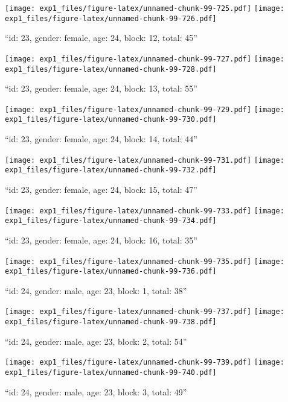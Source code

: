 \documentclass[,]{article}
\begin{document}
\texttt{[image: exp1\_files/figure-latex/unnamed-chunk-99-725.pdf]}
\texttt{[image: exp1\_files/figure-latex/unnamed-chunk-99-726.pdf]}

\newpage
[1] 

``id: 23, gender: female, age: 24, block: 12, total: 45''

\texttt{[image: exp1\_files/figure-latex/unnamed-chunk-99-727.pdf]}
\texttt{[image: exp1\_files/figure-latex/unnamed-chunk-99-728.pdf]}

\newpage
[1] 

``id: 23, gender: female, age: 24, block: 13, total: 55''

\texttt{[image: exp1\_files/figure-latex/unnamed-chunk-99-729.pdf]}
\texttt{[image: exp1\_files/figure-latex/unnamed-chunk-99-730.pdf]}

\newpage
[1] 

``id: 23, gender: female, age: 24, block: 14, total: 44''

\texttt{[image: exp1\_files/figure-latex/unnamed-chunk-99-731.pdf]}
\texttt{[image: exp1\_files/figure-latex/unnamed-chunk-99-732.pdf]}

\newpage
[1] 

``id: 23, gender: female, age: 24, block: 15, total: 47''

\texttt{[image: exp1\_files/figure-latex/unnamed-chunk-99-733.pdf]}
\texttt{[image: exp1\_files/figure-latex/unnamed-chunk-99-734.pdf]}

\newpage
[1] 

``id: 23, gender: female, age: 24, block: 16, total: 35''

\texttt{[image: exp1\_files/figure-latex/unnamed-chunk-99-735.pdf]}
\texttt{[image: exp1\_files/figure-latex/unnamed-chunk-99-736.pdf]}

\newpage
[1] 

``id: 24, gender: male, age: 23, block: 1, total: 38''

\texttt{[image: exp1\_files/figure-latex/unnamed-chunk-99-737.pdf]}
\texttt{[image: exp1\_files/figure-latex/unnamed-chunk-99-738.pdf]}

\newpage
[1] 

``id: 24, gender: male, age: 23, block: 2, total: 54''

\texttt{[image: exp1\_files/figure-latex/unnamed-chunk-99-739.pdf]}
\texttt{[image: exp1\_files/figure-latex/unnamed-chunk-99-740.pdf]}

\newpage
[1] 

``id: 24, gender: male, age: 23, block: 3, total: 49''
\end{document}
